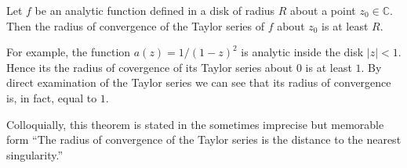 \documentclass[12pt]{article}
\begin{document}
Let $f$ be an analytic function defined in a disk of radius $R$ about a point $z_0 \in \mathbb{C}$.  Then the radius of convergence of the Taylor series of $f$ about $z_0$ is at least $R$.

For example, the function $a(z) = 1 / (1 - z)^2$ is analytic inside the disk $|z| < 1$.  Hence its the radius of covergence of its Taylor series about $0$ is at least $1$.  By direct examination of the Taylor series we can see that its radius of convergence is, in fact, equal to $1$.

Colloquially, this theorem is stated in the sometimes imprecise but memorable form ``The radius of convergence of the Taylor series is the distance to the nearest singularity.''
\end{document}
